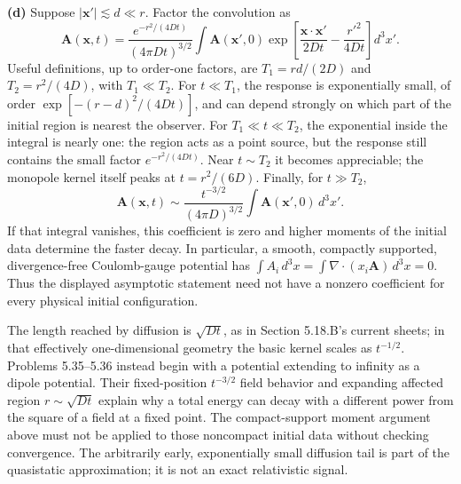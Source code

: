\textbf{(d)} Suppose $|\mathbf x'|\lesssim d\ll r$. Factor the convolution as
\[
\mathbf A(\mathbf x,t)=\frac{e^{-r^2/(4Dt)}}{(4\pi Dt)^{3/2}}
\int\mathbf A(\mathbf x',0)
\exp\left[\frac{\mathbf x\cdot\mathbf x'}{2Dt}-\frac{r'^2}{4Dt}\right]d^3x'.
\]
Useful definitions, up to order-one factors, are
$T_1=rd/(2D)$ and $T_2=r^2/(4D)$, with $T_1\ll T_2$.
For $t\ll T_1$, the response is exponentially small, of order
$\exp[-(r-d)^2/(4Dt)]$, and can depend strongly on which part of the initial
region is nearest the observer. For $T_1\ll t\ll T_2$, the exponential
inside the integral is nearly one: the region acts as a point source,
but the response still contains the small factor $e^{-r^2/(4Dt)}$.
Near $t\sim T_2$ it becomes appreciable; the monopole kernel itself peaks
at $t=r^2/(6D)$. Finally, for $t\gg T_2$,
\[
\boxed{\mathbf A(\mathbf x,t)\sim
\frac{t^{-3/2}}{(4\pi D)^{3/2}}\int\mathbf A(\mathbf x',0)\,d^3x'.}
\]
If that integral vanishes, this coefficient is zero and higher moments of
the initial data determine the faster decay. In particular, a smooth,
compactly supported, divergence-free Coulomb-gauge potential has
$\int A_i\,d^3x=\int\nabla\cdot(x_i\mathbf A)\,d^3x=0$.
Thus the displayed asymptotic statement need not have a nonzero coefficient
for every physical initial configuration.

The length reached by diffusion is $\sqrt{Dt}$, as in Section 5.18.B's
current sheets; in that effectively one-dimensional geometry the basic
kernel scales as $t^{-1/2}$. Problems 5.35--5.36 instead begin with a
potential extending to infinity as a dipole potential. Their fixed-position
$t^{-3/2}$ field behavior and expanding affected region $r\sim\sqrt{Dt}$
explain why a total energy can decay with a different power from the
square of a field at a fixed point. The compact-support moment argument
above must not be applied to those noncompact initial data without checking
convergence. The arbitrarily early, exponentially small diffusion tail is
part of the quasistatic approximation; it is not an exact relativistic signal.

